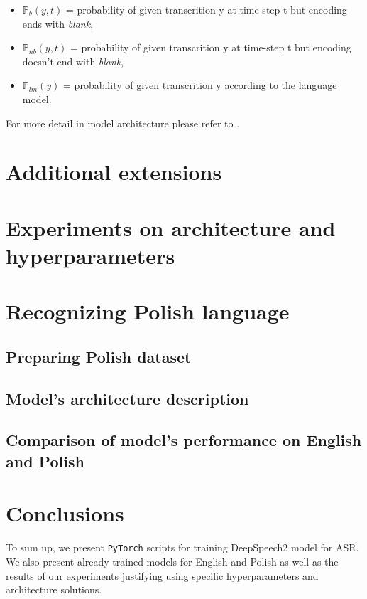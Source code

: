 \documentclass[licencjacka,en]{pracamgr}
\begin{document}
\begin{itemize}
  \item $\mathbb{P}_{b}(y, t)$ = probability of given transcrition y at time-step t but encoding ends with \textit{blank},
  \item $\mathbb{P}_{nb}(y, t)$ = probability of given transcrition y at time-step t but encoding doesn't end with \textit{blank},
  \item $\mathbb{P}_{lm}(y)$ = probability of given transcrition y according to the language model.\\
\end{itemize}
For more detail in model architecture please refer to \cite{DS2}.


\chapter{Additional extensions}\label{r:extens}


\chapter{Experiments on architecture and hyperparameters}\label{r:hypers}


\chapter{Recognizing Polish language}\label{r:polish}

\section{Preparing Polish dataset}
\section{Model’s architecture description}
\section{Comparison of model's performance on English and Polish}


\chapter{Conclusions}\label{r:concls}

To sum up, we present \texttt{PyTorch} scripts for training DeepSpeech2 model for ASR. We also present already trained models for English and Polish as well as the results of our experiments justifying using specific hyperparameters and architecture solutions.\\
\end{document}
